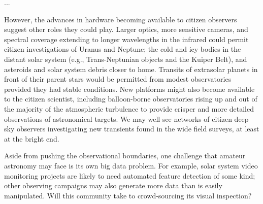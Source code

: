 \documentclass{ar2e}
\begin{document}
...




However, the advances in hardware becoming available to citizen observers
suggest other roles they could play. Larger optics, more sensitive cameras, and
spectral coverage extending to longer wavelengths in the infrared could permit
citizen investigations of Uranus and Neptune; the cold and icy bodies in the
distant solar system (e.g., Trans-Neptunian objects and the Kuiper Belt), and
asteroids and solar system debris closer to home.  Transits of extrasolar
planets in front of their parent stars would be permitted from modest
observatories provided they had stable conditions.  New platforms might also
become available to the citizen scientist, including balloon-borne observatories
rising up and out of the majority of the atmospheric turbulence to provide
crisper and more detailed observations of astronomical targets. We may well see
networks of citizen deep sky observers investigating new transients found in the
wide field surveys, at least at the bright end. 

Aside from pushing the observational boundaries, one challenge that amateur
astronomy may face is its own big data problem.   For example, solar system
video monitoring projects are likely to need automated feature detection of some
kind; other observing campaigns may also generate more data than is easily
manipulated. Will this community take to crowd-sourcing its visual inspection?

\end{document}
